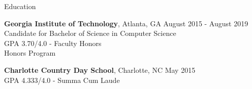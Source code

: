 \documentclass{resume} %
\begin{document}
\begin{rSection}{Education}

  \textbf{Georgia Institute of Technology}, Atlanta, GA \hfill {August 2015 - August 2019}
  \\ Candidate for Bachelor of Science in Computer Science
  \\ GPA 3.70/4.0 - Faculty Honors
  \\ Honors Program

  \textbf{Charlotte Country Day School}, Charlotte, NC \hfill {May 2015}
  \\ GPA 4.333/4.0 - Summa Cum Laude

\end{rSection}

\end{document}
